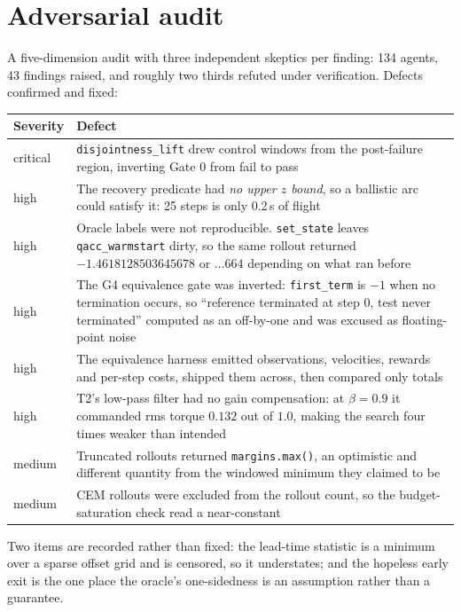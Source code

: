 \documentclass[11pt,a4paper]{article}
\begin{document}
\section{Adversarial audit}

A five-dimension audit with three independent skeptics per finding: 134 agents, 43 findings
raised, and roughly two thirds refuted under verification. Defects confirmed and fixed:

\begin{table}[H]
\centering
\small
\begin{tabular}{p{1.6cm}p{12.4cm}}
\toprule
Severity & Defect \\
\midrule
critical & \texttt{disjointness\_lift} drew control windows from the post-failure region,
  inverting Gate 0 from fail to pass \\
high & The recovery predicate had \emph{no upper $z$ bound}, so a ballistic arc could satisfy it:
  25 steps is only 0.2\,s of flight \\
high & Oracle labels were not reproducible. \texttt{set\_state} leaves \texttt{qacc\_warmstart}
  dirty, so the same rollout returned $-1.4618128503645678$ or $\ldots664$ depending on what ran
  before \\
high & The G4 equivalence gate was inverted: \texttt{first\_term} is $-1$ when no termination
  occurs, so ``reference terminated at step 0, test never terminated'' computed as an off-by-one
  and was excused as floating-point noise \\
high & The equivalence harness emitted observations, velocities, rewards and per-step costs,
  shipped them across, then compared only totals \\
high & T2's low-pass filter had no gain compensation: at $\beta = 0.9$ it commanded rms torque
  $0.132$ out of $1.0$, making the search four times weaker than intended \\
medium & Truncated rollouts returned \texttt{margins.max()}, an optimistic and different quantity
  from the windowed minimum they claimed to be \\
medium & CEM rollouts were excluded from the rollout count, so the budget-saturation check read a
  near-constant \\
\bottomrule
\end{tabular}
\end{table}

Two items are recorded rather than fixed: the lead-time statistic is a minimum over a sparse
offset grid and is censored, so it understates; and the hopeless early exit is the one place the
oracle's one-sidedness is an assumption rather than a guarantee.
\end{document}
